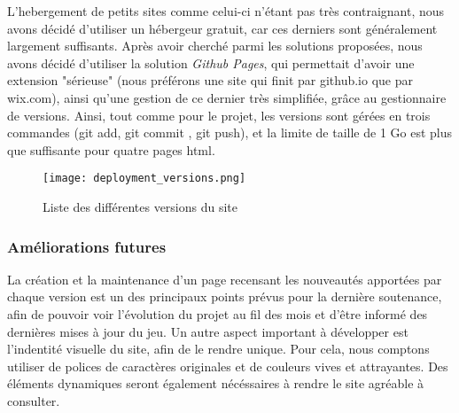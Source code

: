     L'hebergement de petits sites comme celui-ci n'étant pas très contraignant,
    nous avons décidé d'utiliser un hébergeur gratuit, car ces derniers
    sont généralement largement suffisants. Après avoir cherché parmi les
    solutions proposées, nous avons décidé d'utiliser la solution 
    \textit{Github Pages}, qui permettait d'avoir une extension "sérieuse"
    (nous préférons une site qui finit par github.io que par wix.com),
    ainsi qu'une gestion de ce dernier très simplifiée, grâce au gestionnaire de versions.
    Ainsi, tout comme pour le projet, les versions sont gérées en trois commandes 
    (git add, git commit , git push), et la limite de taille de 1 Go est plus que suffisante pour quatre pages html. 


    \begin{figure}[hbt!]
        \centering
        \texttt{[image: deployment\_versions.png]}
        \caption{Liste des différentes versions du site}
    \end{figure}

    
    \subsubsection{Améliorations futures}

    La création et la maintenance d'un page recensant les nouveautés apportées par chaque version est un des 
    principaux points prévus pour la dernière soutenance, afin de pouvoir voir l'évolution du projet au fil des 
    mois et d'être informé des dernières mises à jour du jeu. Un autre aspect important à développer est l'indentité
    visuelle du site, afin de le rendre unique. Pour cela,  nous comptons utiliser de polices de caractères originales 
    et de couleurs vives et attrayantes. Des éléments dynamiques seront également nécéssaires à rendre le site agréable 
    à consulter.